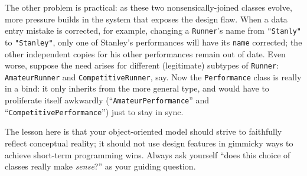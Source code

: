 The other problem is practical: as these two nonsensically-joined classes
evolve, more pressure builds in the system that exposes the design flaw. When
a data entry mistake is corrected, for example, changing a \texttt{Runner}'s
name from \texttt{"Stanly"} to \texttt{"Stanley"}, only one of Stanley's
performances will have its \texttt{name} corrected; the other independent
copies for his other performances remain out of date. Even worse, suppose the
need arises for different (legitimate) subtypes of \texttt{Runner}:
\texttt{AmateurRunner} and \texttt{CompetitiveRunner}, say. Now
the \texttt{Performance} class is really in a bind: it only inherits from the
more general type, and would have to proliferate itself awkwardly
(``\texttt{AmateurPerformance}'' and ``\texttt{CompetitivePerformance}'') just
to stay in sync.

The lesson here is that your object-oriented model should strive to faithfully
reflect conceptual reality; it should not use design features in gimmicky ways
to achieve short-term programming wins. Always ask yourself ``does this choice
of classes really make \textit{sense}?'' as your guiding question.

